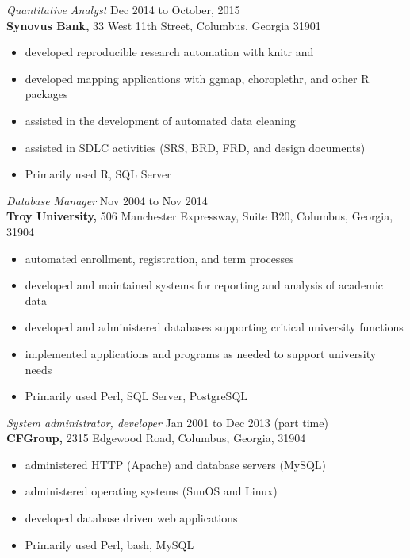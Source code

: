 \documentclass[margin, 10pt]{res} %
\begin{document}
\begin{resume}
{\it Quantitative Analyst} \hfill Dec 2014 to October, 2015 \\
\textbf{Synovus Bank,} \hfill 33 West 11th Street, Columbus, Georgia 31901
\begin{itemize} \itemsep -2pt %
            \footnotesize
\item developed reproducible research automation with knitr and \LaTeXe
\item developed mapping applications with ggmap, choroplethr, and other \textsf{R} packages
\item assisted in the development of automated data cleaning 
\item assisted in SDLC activities (SRS, BRD, FRD, and design documents)
\item Primarily used \textsf{R}, SQL Server
\end{itemize}
 
{\it Database Manager} \hfill Nov 2004 to Nov 2014 \\
\textbf{Troy University,} 506 Manchester Expressway, Suite B20, Columbus, Georgia, 31904
\begin{itemize} \itemsep -2pt %
            \footnotesize
\item automated enrollment, registration, and term processes
\item developed and maintained systems for reporting and analysis of academic data
\item developed and administered databases supporting critical university functions 
\item implemented applications and programs as needed to support university needs 
\item Primarily used Perl, SQL Server, PostgreSQL
\end{itemize}
 
{\it System administrator, developer} \hfill Jan 2001 to Dec 2013 (part time) \\
\textbf{CFGroup,} \hfill 2315 Edgewood Road, Columbus, Georgia, 31904
\begin{itemize} \itemsep -2pt %
            \footnotesize
\item administered HTTP (Apache) and database servers (MySQL)
\item administered operating systems (SunOS and Linux)
\item developed database driven web applications
\item Primarily used Perl, bash, MySQL
\end{itemize}
 

\end{resume}
\end{document}
